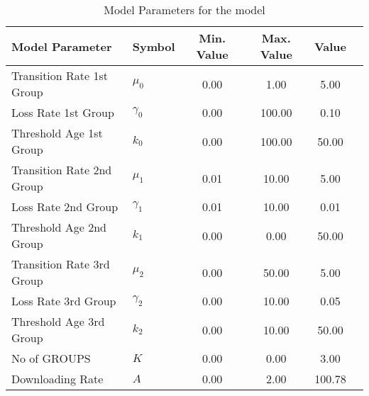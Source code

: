 \begin{table}
\centering
\begin{tabular}{p{5cm}lcccc}
{\bf Model Parameter} & {\bf Symbol} & {\bf Min. Value} & {\bf Max. Value} & {\bf Value}\\
\hline\hline
Transition Rate 1st Group & $\mu_0$ & 0.00 & 1.00 & 5.00\\
Loss Rate 1st Group & $\gamma_0$ & 0.00 & 100.00 & 0.10\\
Threshold Age 1st Group & $k_0$ & 0.00 & 100.00 & 50.00\\
Transition Rate 2nd Group & $\mu_1$ & 0.01 & 10.00 & 5.00\\
Loss Rate 2nd Group & $\gamma_1$ & 0.01 & 10.00 & 0.01\\
Threshold Age 2nd Group & $k_1$ & 0.00 & 0.00 & 50.00\\
Transition Rate 3rd Group & $\mu_2$ & 0.00 & 50.00 & 5.00\\
Loss Rate 3rd Group & $\gamma_2$ & 0.00 & 10.00 & 0.05\\
Threshold Age 3rd Group & $k_2$ & 0.00 & 10.00 & 50.00\\
No of GROUPS & $K$ & 0.00 & 0.00 & 3.00\\
Downloading Rate & $A$ & 0.00 & 2.00 & 100.78\\
\hline\hline
\end{tabular}
\caption{Model Parameters for the model}
\end{table}
